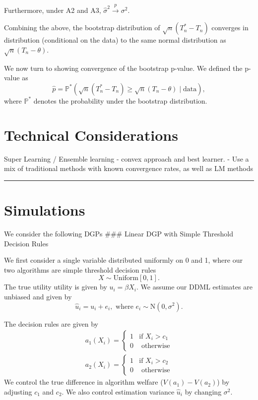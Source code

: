 \documentclass[
]{article}
\begin{document}
Furthermore, under A2 and A3,
\(\hat{\sigma}^2 \xrightarrow{p} \sigma^2\).

Combining the above, the bootstrap distribution of
\(\sqrt{ n }(T^*_{n} - T_{n})\) converges in distribution (conditional
on the data) to the same normal distribution as
\(\sqrt{ n }(T_{n}-\theta)\).

We now turn to showing convergence of the bootstrap p-value. We defined
the p-value as \[
\hat{p} = \mathbb{P}^*(\sqrt{ n }(T^*_{n} - T_{n}) \geq \sqrt{ n }(T_{n}-\theta) \mid \text{data}),
\] where \(\mathbb{P^*}\) denotes the probability under the bootstrap
distribution.

\section{Technical Considerations}\label{technical-considerations}

Super Learning / Ensemble learning - convex approach and best learner. -
Use a mix of traditional methods with known convergence rates, as well
as LM methods

\begin{center}\rule{0.5\linewidth}{0.5pt}\end{center}

\section{Simulations}\label{simulations}

We consider the following DGPs \#\#\# Linear DGP with Simple Threshold
Decision Rules

We first consider a single variable distributed uniformly on 0 and 1,
where our two algorithms are simple threshold decision rules \[
X \sim \text{Uniform}[0, 1].
\] The true utility utility is given by \(u_{i} = \beta X_{i}\). We
assume our DDML estimates are unbiased and given by \[
\hat{u}_{i} = u_{i} + e_{i}, \text{ where } e_{i} \sim \text{N}(0, \sigma^2).
\]

The decision rules are given by \[
\begin{aligned}
a_{1}(X_{i})= \begin{cases} 
1  & \text{if } X_{i} > c_{1} \\
0  & \text{ otherwise}
\end{cases} \\
a_{2}(X_{i})= \begin{cases} 
1  & \text{if } X_{i} > c_{2} \\
0  & \text{ otherwise}
\end{cases}
\end{aligned}
\] We control the true difference in algorithm welfare
(\(V(a_{1}) - V(a_{2})\)) by adjusting \(c_{1}\) and \(c_{2}\). We also
control estimation variance \(\hat{u}_{i}\) by changing \(\sigma^2\).
\end{document}
